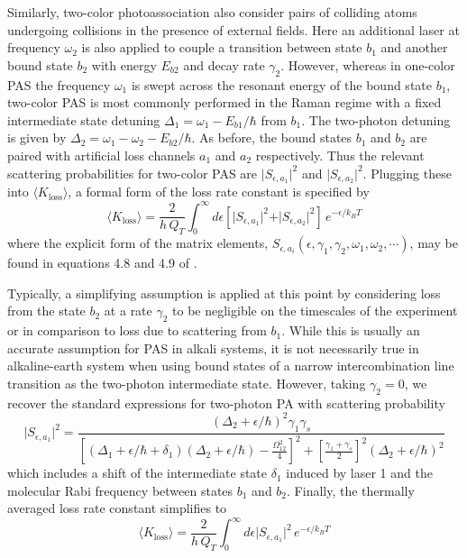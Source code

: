 Similarly, two-color photoassociation also consider pairs of colliding atoms undergoing collisions in the presence of external fields.
Here an additional laser at frequency $\omega_2$ is also applied to couple a transition between state $b_1$ and another bound state $b_2$ with energy $E_{b2}$ and decay rate $\gamma_2$.
However, whereas in one-color PAS the frequency $\omega_1$ is swept across the resonant energy of the bound state $b_1$, two-color PAS is most commonly performed in the Raman regime with a fixed intermediate state detuning $\Delta_1 = \omega_1 - E_{b1}/\hbar$ from $b_1$.
The two-photon detuning is given by $\Delta_2 = \omega_1 - \omega_2 - E_{b2}/\hbar$.
As before, the bound states $b_1$ and $b_2$ are paired with artificial loss channels $a_1$ and $a_2$ respectively.
Thus the relevant scattering probabilities for two-color PAS are $\vert S_{\epsilon, a_1} \vert^2$ and $\vert S_{\epsilon, a_2} \vert^2$.
Plugging these into $\langle K_{\text{loss}} \rangle$, a formal form of the loss rate constant is specified by
\begin{equation} \label{eq:kLoss2Ph}
  \langle K_{\text{loss}} \rangle = \frac{2}{h\,Q_{T}} \int_{0}^{\infty} d\epsilon \left[ \vert S_{\epsilon, a_1} \vert^2 + \vert S_{\epsilon, a_2} \vert^2 \right] \,e^{-\epsilon/k_{B}T}
\end{equation}
where the explicit form of the matrix elements, $S_{\epsilon, a_i}(\epsilon,\gamma_1,\gamma_2,\omega_1,\omega_2,\cdots)$, may be found in equations 4.8 and 4.9 of \cite{Bohn1999}.

Typically, a simplifying assumption is applied at this point by considering loss from the state $b_2$ at a rate $\gamma_2$ to be negligible on the timescales of the experiment or in comparison to loss due to scattering from $b_1$.
While this is usually an accurate assumption for PAS in alkali systems, it is not necessarily true in alkaline-earth system when using bound states of a narrow intercombination line transition as the two-photon intermediate state.
However, taking $\gamma_2=0$, we recover the standard expressions for two-photon PA with scattering probability
\begin{equation} \label{eq:twoPhotonSe1}
	\vert  S_{\epsilon, a_1} \vert^2 = \frac{(\Delta_2 + \epsilon/\hbar)^2 \gamma_1 \gamma_s}{
  	\left[ (\Delta_1+\epsilon/\hbar+\delta_1) (\Delta_2+\epsilon/\hbar)-\frac{\Omega_{12}^{2}}{4}\right]^2 + \left[ \frac{\gamma_1 + \gamma_s}{2}\right]^2 (\Delta_2+\epsilon/\hbar)^2}
\end{equation}
which includes a shift of the intermediate state $\delta_1$ induced by laser 1 and the molecular Rabi frequency between states $b_1$ and $b_2$.
Finally, the thermally averaged loss rate constant simplifies to
\begin{equation} \label{eq:twoPhotonKavg}
	\langle K_{\text{loss}} \rangle = \frac{2}{h\,Q_{T}} \int_{0}^{\infty} d\epsilon \vert  S_{\epsilon, a_1} \vert^2 \,e^{-\epsilon/k_{B}T}
\end{equation}



